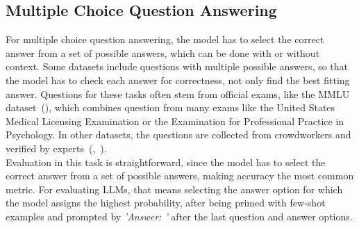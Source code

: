 \subsection{Multiple Choice Question Answering}\label{multiple-choice-qa}
For multiple choice question answering, the model has to select the correct answer from a set of possible answers, which can be done with or without context.
Some datasets include questions with multiple possible answers, so that the model has to check each answer for correctness, not only find the best fitting answer.
Questions for these tasks often stem from official exams, like the MMLU dataset~(\cite{hendrycks:2020}), which combines question from many exams like the United States Medical Licensing Examination or the Examination for Professional Practice in Psychology.
In other datasets, the questions are collected from crowdworkers and verified by experts~(\cite{clark:2018},~\cite{mihaylov:2018}).
\\
Evaluation in this task is straightforward, since the model has to select the correct answer from a set of possible answers, making accuracy the most common metric.
For evaluating LLMs, that means selecting the answer option for which the model assigns the highest probability, after being primed with few-shot examples and prompted by \textit{'Answer: '} after the last question and answer options.

